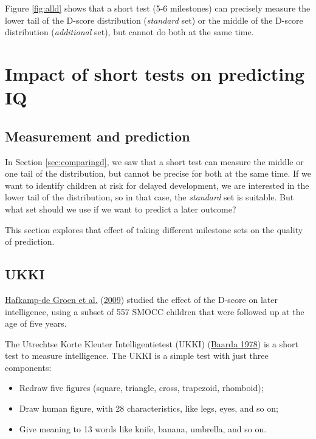 \documentclass[
]{book}
\begin{document}
Figure \ref{fig:alld} shows that a short test (5-6 milestones) can precisely measure the lower tail of the D-score distribution (\emph{standard} set) or the middle of the D-score distribution (\emph{additional} set), but cannot do both at the same time.

\hypertarget{sec:predictiq}{%
\section{Impact of short tests on predicting IQ}\label{sec:predictiq}}

\hypertarget{measurement-and-prediction}{%
\subsection{Measurement and prediction}\label{measurement-and-prediction}}

In Section \ref{sec:comparingd}, we saw that a short test can measure the middle or one tail of the distribution, but cannot be precise for both at the same time. If we want to identify children at risk for delayed development, we are interested in the lower tail of the distribution, so in that case, the \emph{standard} set is suitable. But what set should we use if we want to predict a later outcome?

This section explores that effect of taking different milestone sets on the quality of prediction.

\hypertarget{ukki}{%
\subsection{UKKI}\label{ukki}}

\protect\hyperlink{ref-hafkamp2009}{Hafkamp-de Groen et al.} (\protect\hyperlink{ref-hafkamp2009}{2009}) studied the effect of the D-score on later intelligence, using a subset of 557 SMOCC children that were followed up at the age of five years.

The Utrechtse Korte Kleuter Intelligentietest (UKKI) (\protect\hyperlink{ref-baarda1978}{Baarda 1978}) is a short test to measure intelligence. The UKKI is a simple test with just three components:

\begin{itemize}
\item
  Redraw five figures (square, triangle, cross, trapezoid, rhomboid);
\item
  Draw human figure, with 28 characteristics, like legs, eyes, and so on;
\item
  Give meaning to 13 words like knife, banana, umbrella, and so on.
\end{itemize}
\end{document}
